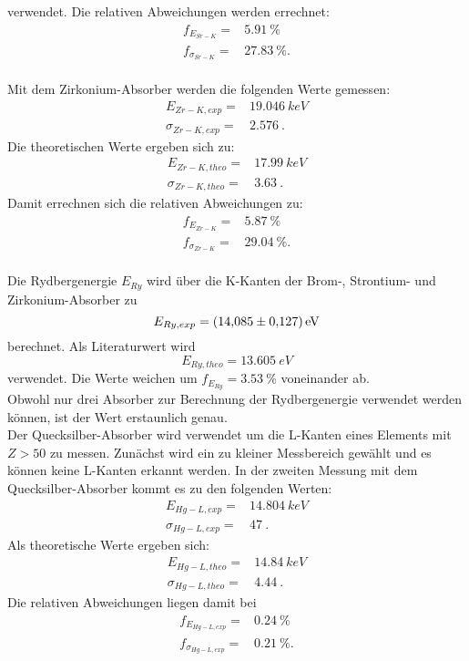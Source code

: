 verwendet.
Die relativen Abweichungen werden errechnet:
\begin{align*}
  f_{E_{Sr-K}}      =&  \SI{5.91}{\%}\\
  f_{\sigma_{Sr-K}} =&  \SI{27.83}{\%}.
\end{align*}
\\Mit dem Zirkonium-Absorber werden die folgenden Werte gemessen:
\begin{align*}
  E_{Zr-K, exp}       =& \SI{19.046}{keV} \\
  \sigma_{Zr-K, exp}  =& \SI{2.576}{}.
\end{align*}
Die theoretischen Werte ergeben sich zu:
\begin{align*}
  E_{Zr-K, theo}      =& \SI{17.99}{keV}\\
  \sigma_{Zr-K, theo} =& \SI{3.63}{}.
\end{align*}
Damit errechnen sich die relativen Abweichungen zu:
\begin{align*}
  f_{E_{Zr-K}}      =&  \SI{5.87}{\%}\\
  f_{\sigma_{Zr-K}} =&  \SI{29.04}{\%}.
\end{align*}
\\Die Rydbergenergie $E_{Ry}$ wird über die K-Kanten der Brom-, Strontium- und Zirkonium-Absorber zu
\begin{equation*}
  E_{Ry, exp}=\SI{14.085 \pm 0.127}{eV}
\end{equation*}
berechnet.
Als Literaturwert wird
\begin{equation*}
  E_{Ry, theo}= \SI{13.605}{eV}
\end{equation*}
verwendet.
Die Werte weichen um $f_{E_{Ry}}= \SI{3.53}{\%}$ voneinander ab.
\\Obwohl nur drei Absorber zur Berechnung der Rydbergenergie verwendet werden können, ist der Wert erstaunlich genau.
\\Der Quecksilber-Absorber wird verwendet um die L-Kanten eines Elements mit $Z>50$ zu messen.
Zunächst wird ein zu kleiner Messbereich gewählt und es können keine L-Kanten erkannt werden.
In der zweiten Messung mit dem Quecksilber-Absorber kommt es zu den folgenden Werten:
\begin{align*}
  E_{Hg-L, exp}       =& \SI{14.804}{keV}\\
  \sigma_{Hg-L, exp}  =& \SI{47}{}.
\end{align*}
Als theoretische Werte ergeben sich:
\begin{align*}
  E_{Hg-L, theo}       =& \SI{14.84}{keV}\\
  \sigma_{Hg-L, theo}  =& \SI{4.44}{}.
\end{align*}
Die relativen Abweichungen liegen damit bei
\begin{align*}
  f_{E_{Hg-L, exp}}       =& \SI{0.24}{\%}\\
  f_{\sigma_{Hg-L, exp}}  =& \SI{0.21}{\%}.
\end{align*}

\FloatBarrier

